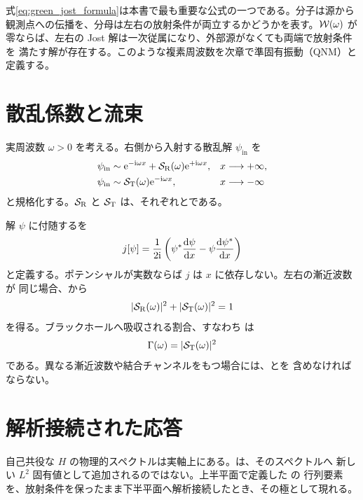 式\eqref{eq:green_jost_formula}は本書で最も重要な公式の一つである。分子は源から
観測点への伝播を、分母は左右の放射条件が両立するかどうかを表す。$\mathcal{W}(\omega)$
が零ならば、左右の Jost 解は一次従属になり、外部源がなくても両端で放射条件を
満たす解が存在する。このような複素周波数を次章で準固有振動（QNM）と定義する。

\section{散乱係数と流束}

実周波数 $\omega>0$ を考える。右側から入射する散乱解 $\psi_{\mathrm{in}}$ を
\begin{align}
\psi_{\mathrm{in}}
&\sim
\mathrm{e}^{-\mathrm{i}\omega x}
+\mathcal{S}_{\mathrm{R}}(\omega)
\mathrm{e}^{+\mathrm{i}\omega x},
&&x\longrightarrow+\infty,
\label{eq:scatter_right}
\\
\psi_{\mathrm{in}}
&\sim
\mathcal{S}_{\mathrm{T}}(\omega)
\mathrm{e}^{-\mathrm{i}\omega x},
&&x\longrightarrow-\infty
\label{eq:scatter_left}
\end{align}
と規格化する。$\mathcal{S}_{\mathrm{R}}$ と $\mathcal{S}_{\mathrm{T}}$ は、それぞれとである。

解 $\psi$ に付随するを
\begin{equation}
j[\psi]
=
\frac{1}{2\mathrm{i}}
\left(
\psi^*\frac{\mathrm{d}\psi}{\mathrm{d} x}
-
\psi\frac{\mathrm{d}\psi^*}{\mathrm{d} x}
\right)
\label{eq:conserved_flux}
\end{equation}
と定義する。ポテンシャルが実数ならば $j$ は $x$ に依存しない。左右の漸近波数が
同じ場合、から
\begin{equation}
|\mathcal{S}_{\mathrm{R}}(\omega)|^2
+
|\mathcal{S}_{\mathrm{T}}(\omega)|^2
=
1
\label{eq:unitarity_one_channel}
\end{equation}
を得る。ブラックホールへ吸収される割合、すなわち  は
\begin{equation}
\Gamma(\omega)
=
|\mathcal{S}_{\mathrm{T}}(\omega)|^2
\label{eq:greybody_factor}
\end{equation}
である。異なる漸近波数や結合チャンネルをもつ場合には、とを
含めなければならない。

\section{解析接続された応答}

自己共役な $H$ の物理的スペクトルは実軸上にある。は、そのスペクトルへ
新しい $L^2$ 固有値として追加されるのではない。上半平面で定義した の
行列要素を、放射条件を保ったまま下半平面へ解析接続したとき、その極として現れる。

